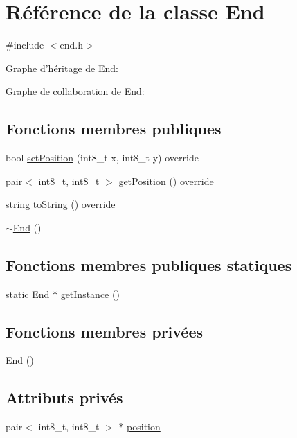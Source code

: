 \hypertarget{class_end}{\section{Référence de la classe End}
\label{class_end}
}


{\ttfamily \#include $<$end.\-h$>$}



Graphe d'héritage de End\-:


Graphe de collaboration de End\-:
\subsection*{Fonctions membres publiques}
\begin{DoxyCompactItemize}
\item 
bool \hyperlink{class_end_a5be9587f22c8eb23249513a7b5e6db92}{set\-Position} (int8\-\_\-t x, int8\-\_\-t y) override
\item 
pair$<$ int8\-\_\-t, int8\-\_\-t $>$ \hyperlink{class_end_ac1365bd526e9ca1f5c8e9d80dc750a36}{get\-Position} () override
\item 
string \hyperlink{class_end_a842b7c55b27248102aee289c1337275b}{to\-String} () override
\item 
\hyperlink{class_end_aa3481cbe712c9cdef228786ffa7f0aad}{$\sim$\-End} ()
\end{DoxyCompactItemize}
\subsection*{Fonctions membres publiques statiques}
\begin{DoxyCompactItemize}
\item 
static \hyperlink{class_end}{End} $\ast$ \hyperlink{class_end_a527baaf33dbb6431d94759f75e8b9f5a}{get\-Instance} ()
\end{DoxyCompactItemize}
\subsection*{Fonctions membres privées}
\begin{DoxyCompactItemize}
\item 
\hyperlink{class_end_acd25fa8f481c50f5b8eaff4af1159942}{End} ()
\end{DoxyCompactItemize}
\subsection*{Attributs privés}
\begin{DoxyCompactItemize}
\item 
pair$<$ int8\-\_\-t, int8\-\_\-t $>$ $\ast$ \hyperlink{class_end_a842874e9ed3602783ab323850621c060}{position}
\end{DoxyCompactItemize}
